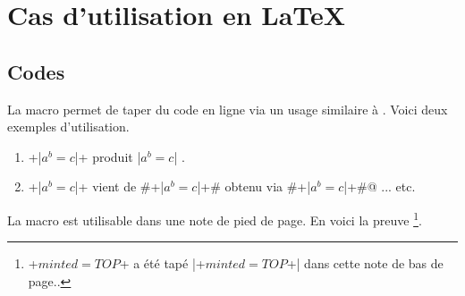 

\usepackage[lang = french]{../main/main}
\usepackage{../macroenv/macroenv}
\usepackage{../inenglish/inenglish}
\usepackage{../showcase/showcase}
\usepackage{../focus/focus}


\usepackage{listing}







\section{Cas d'utilisation en \LaTeX}

\subsection{Codes }

La macro  permet de taper du code en ligne via un usage similaire à .
Voici deux exemples d'utilisation.

\begin{enumerate}
    \item \bdocinlatex+\bdocinlatex|$a^b = c$|+ produit \bdocinlatex|$a^b = c$| .

    \item \bdocinlatex+\bdocinlatex|$a^b = c$|+ vient de \bdocinlatex#\bdocinlatex+\bdocinlatex|$a^b = c$|+# obtenu via \bdocinlatex@\bdocinlatex#\bdocinlatex+\bdocinlatex|$a^b = c$|+#@ ... etc.
\end{enumerate}


\begin{bdocinfo}
    La macro  est utilisable dans une note de pied de page. En voici la preuve
    \footnote{
    	\bdocinlatex+$minted = TOP$+ a été tapé \bdocinlatex|\bdocinlatex+$minted = TOP$+| dans cette note de bas de page..
    }.
\end{bdocinfo}


